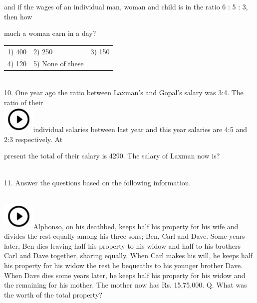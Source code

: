 \documentclass{article}
\begin{document}
\noindent and if the wages of an individual man, woman and child is in the ratio 6 : 5 : 3, then how

\noindent 

\noindent much a woman earn in a day?

\noindent 

\noindent \begin{tabular}{p{1.7in} p{1.6in} p{1.6in}} \\ 
 1) 400                      &  2) 250               &  3) 150               \\
4) 120               & 5) None of these  \\
\end{tabular} 

\noindent 

\noindent  \\  

10. One year ago the ratio between Laxman's and Gopal's salary was 3:4. The ratio of their  
	\noindent \\ \includegraphics*[width=0.61in, height=0.52in]{images/image1}individual salaries between last year and this year salaries are 4:5 and 2:3 respectively. At

\noindent present the total of their salary is 4290. The salary of Laxman now is?

\noindent 


\noindent \\   11. Answer the questions based on the following information.

\noindent  
	\noindent \\ \includegraphics*[width=0.61in, height=0.52in]{images/image1}Alphonso, on his deathbed, keeps half his property for his wife and divides the rest equally among  his  three sons; Ben, Carl and Dave. Some years later, Ben dies leaving half his property to his widow and half to his brothers Carl and Dave together, sharing equally. When Carl makes his will, he keeps half his property for his widow the rest he bequeaths to his younger brother Dave. When Dave dies some years later, he keeps half his property for his  widow  and  the  remaining  for  his  mother.  The  mother  now  has  Rs.  15,75,000. Q. What was the worth of the total property?
\end{document}
